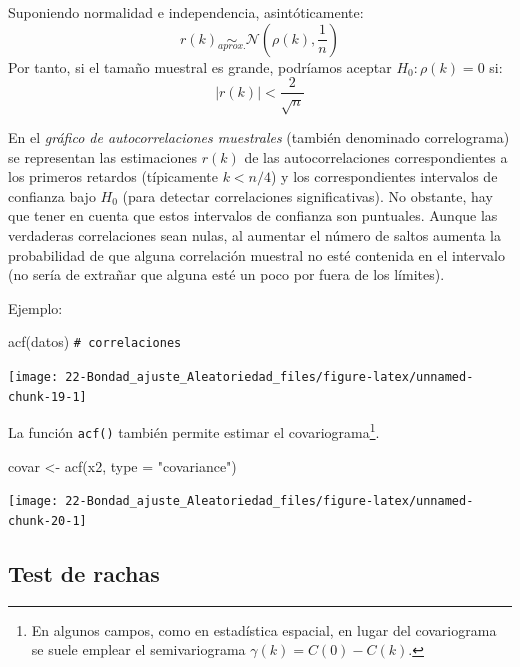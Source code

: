 \documentclass[
  10pt,
]{book}
\newenvironment{Shaded}{\begin{snugshade}}{\end{snugshade}}
\newcommand{\AttributeTok}[1]{\textcolor[rgb]{0.77,0.63,0.00}{#1}}
\newcommand{\CommentTok}[1]{\textcolor[rgb]{0.56,0.35,0.01}{\textit{#1}}}
\newcommand{\FunctionTok}[1]{\textcolor[rgb]{0.00,0.00,0.00}{#1}}
\newcommand{\NormalTok}[1]{#1}
\newcommand{\OtherTok}[1]{\textcolor[rgb]{0.56,0.35,0.01}{#1}}
\newcommand{\StringTok}[1]{\textcolor[rgb]{0.31,0.60,0.02}{#1}}
\theoremstyle{break}
\theoremstyle{nonumberplain}
\renewcommand{\CommentTok}[1]{\textcolor[rgb]{0.41,0.41,0.41}{\texttt{#1}}}
\let\oldfootnote\footnote
\renewcommand\footnote[1]{\oldfootnote{\hspace{2mm}#1}}
\begin{document}
Suponiendo normalidad e independencia, asintóticamente:
\[r(k)\underset{aprox.}{\sim} \mathcal{N}\left(  \rho(k),\frac{1}{n}\right)\]
Por tanto, si el tamaño muestral es grande, podríamos aceptar \(H_0:\rho\left( k\right) = 0\) si:
\[|r(k)| < \dfrac{2}{\sqrt{n}}\]

En el \emph{gráfico de autocorrelaciones muestrales} (también denominado correlograma) se representan las estimaciones \(r(k)\) de las autocorrelaciones correspondientes a los primeros retardos (típicamente \(k<n/4\)) y los correspondientes intervalos de confianza bajo \(H_0\) (para detectar correlaciones significativas).
No obstante, hay que tener en cuenta que estos intervalos de confianza son puntuales.
Aunque las verdaderas correlaciones sean nulas, al aumentar el número de saltos aumenta la probabilidad de que alguna correlación muestral no esté contenida en el intervalo (no sería de extrañar que alguna esté un poco por fuera de los límites).

Ejemplo:

\begin{Shaded}
\begin{Highlighting}[]
\FunctionTok{acf}\NormalTok{(datos)  }\CommentTok{\# correlaciones}
\end{Highlighting}
\end{Shaded}

\begin{center}\texttt{[image: 22-Bondad\_ajuste\_Aleatoriedad\_files/figure-latex/unnamed-chunk-19-1]} \end{center}

La función \texttt{acf()} también permite estimar el covariograma\footnote{En algunos campos, como en estadística espacial, en lugar del covariograma se suele emplear el semivariograma \(\gamma(k) = C(0) - C(k)\).}.

\begin{Shaded}
\begin{Highlighting}[]
\NormalTok{covar }\OtherTok{\textless{}{-}} \FunctionTok{acf}\NormalTok{(x2, }\AttributeTok{type =} \StringTok{"covariance"}\NormalTok{)}
\end{Highlighting}
\end{Shaded}

\begin{center}\texttt{[image: 22-Bondad\_ajuste\_Aleatoriedad\_files/figure-latex/unnamed-chunk-20-1]} \end{center}

\hypertarget{test-de-rachas}{%
\subsection{Test de rachas}\label{test-de-rachas}}
\end{document}
